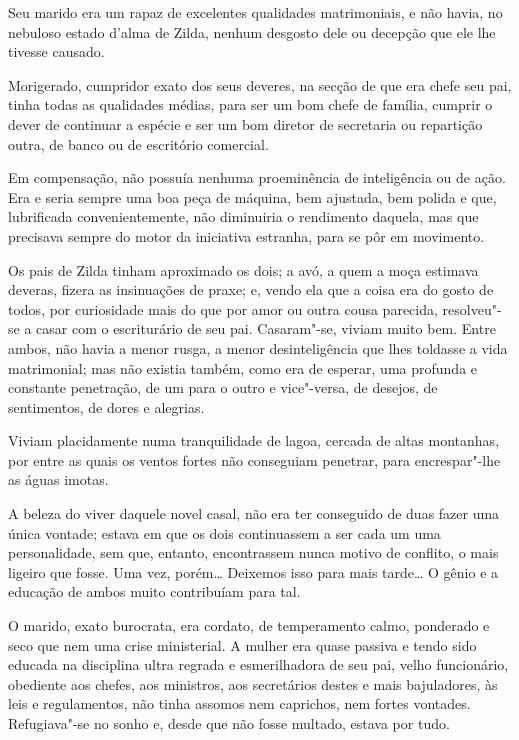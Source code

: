 Seu marido era um rapaz de excelentes qualidades matrimoniais, e não
havia, no nebuloso estado d'alma de Zilda, nenhum desgosto dele ou
decepção que ele lhe tivesse causado.

Morigerado, cumpridor exato dos seus deveres, na secção de que era chefe
seu pai, tinha todas as qualidades médias, para ser um bom chefe de
família, cumprir o dever de continuar a espécie e ser um bom diretor de
secretaria ou repartição outra, de banco ou de escritório comercial.

Em compensação, não possuía nenhuma proeminência de inteligência ou de
ação. Era e seria sempre uma boa peça de máquina, bem ajustada, bem
polida e que, lubrificada convenientemente, não diminuiria o rendimento
daquela, mas que precisava sempre do motor da iniciativa estranha, para
se pôr em movimento.

Os pais de Zilda tinham aproximado os dois; a avó, a quem a moça
estimava deveras, fizera as insinuações de praxe; e, vendo ela que a
coisa era do gosto de todos, por curiosidade mais do que por amor ou
outra cousa parecida, resolveu"-se a casar com o escriturário de seu pai.
Casaram"-se, viviam muito bem. Entre ambos, não havia a menor rusga, a
menor desinteligência que lhes toldasse a vida matrimonial; mas não
existia também, como era de esperar, uma profunda e constante
penetração, de um para o outro e vice"-versa, de desejos, de sentimentos,
de dores e alegrias.

Viviam placidamente numa tranquilidade de lagoa, cercada de altas
montanhas, por entre as quais os ventos fortes não conseguiam penetrar,
para encrespar"-lhe as águas imotas.

A beleza do viver daquele novel casal, não era ter conseguido de duas
fazer uma única vontade; estava em que os dois continuassem a ser cada
um uma personalidade, sem que, entanto, encontrassem nunca motivo de
conflito, o mais ligeiro que fosse. Uma vez, porém\ldots{} Deixemos isso para
mais tarde\ldots{} O gênio e a educação de ambos muito contribuíam para
tal.

O marido, exato burocrata, era cordato, de temperamento calmo, ponderado
e seco que nem uma crise ministerial. A mulher era quase passiva e tendo
sido educada na disciplina ultra regrada e esmerilhadora de seu pai,
velho funcionário, obediente aos chefes, aos ministros, aos secretários
destes e mais bajuladores, às leis e regulamentos, não tinha assomos nem
caprichos, nem fortes vontades. Refugiava"-se no sonho e, desde que não
fosse multado, estava por tudo.

